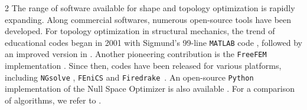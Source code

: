 \documentclass[a4paper, oneside]{article}
\begin{document}
\begin{multicols}{2}
The range of software available for shape and topology optimization is rapidly expanding.
Along commercial softwares, numerous open-source tools have been developed.
For topology optimization in structural mechanics, the trend of educational codes began in 2001 with Sigmund's 99-line \texttt{MATLAB} code \cite{Sigmund2014}, followed by an improved version in \cite{Andreassen2010}. Another pioneering contribution is the \texttt{FreeFEM} implementation \cite{MR2252743}.
Since then, codes have been released for various platforms, including \texttt{NGsolve} \cite{MR4233697}, \texttt{FEniCS} \cite{fenicsx, BLAUTH2021100646,MR3843884} and \texttt{Firedrake}~\cite{Paganini2021}. 
An open-source \texttt{Python} implementation of the Null Space Optimizer is also available \cite{MR4686093}. For a comparison of algorithms, we refer to \cite{Gain2013}.
 

\end{multicols}
\end{document}
